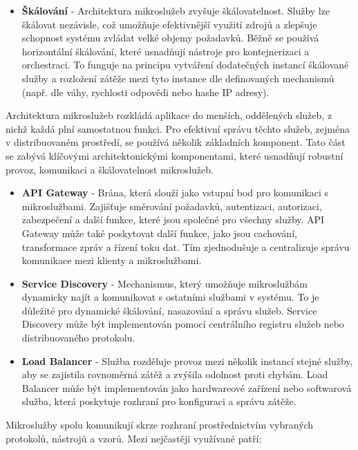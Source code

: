 \begin{itemize}
    \item \textbf{Škálování} - Architektura mikroslužeb zvyšuje škálovatelnost. Služby lze škálovat nezávisle, což umožňuje efektivnější využití zdrojů a zlepšuje schopnost systému zvládat velké objemy požadavků. Běžně se používá horizontální škálování, které usnadňují nástroje pro kontejnerizaci a orchestraci. To funguje na principu vytváření dodatečných instancí škálované služby a rozložení zátěže mezi tyto instance dle definovaných mechanismů (např. dle váhy, rychlosti odpovědi nebo hashe IP adresy).
\end{itemize}


Architektura mikroslužeb rozkládá aplikace do menších, oddělených služeb, z nichž každá plní samostatnou funkci. Pro efektivní správu těchto služeb, zejména v distribuovaném prostředí, se používá několik základních komponent. Tato část se zabývá klíčovými architektonickými komponentami, které usnadňují robustní provoz, komunikaci a škálovatelnost mikroslužeb. \cite{Williams2023}


\begin{itemize}
    \item \textbf{API Gateway} - Brána, která slouží jako vstupní bod pro komunikaci s mikroslužbami. Zajišťuje směrování požadavků, autentizaci, autorizaci, zabezpečení a další funkce, které jsou společné pro všechny služby. API Gateway může také poskytovat další funkce, jako jsou cachování, transformace zpráv a řízení toku dat. Tím zjednodušuje a centralizuje správu komunikace mezi klienty a mikroslužbami.
    \item \textbf{Service Discovery} - Mechanismus, který umožňuje mikroslužbám dynamicky najít a komunikovat s ostatními službami v systému. To je důležité pro dynamické škálování, nasazování a správu služeb. Service Discovery může být implementován pomocí centrálního registru služeb nebo distribuovaného protokolu.
    \item \textbf{Load Balancer} - Služba rozděluje provoz mezi několik instancí stejné služby, aby se zajistila rovnoměrná zátěž a zvýšila odolnost proti chybám. Load Balancer může být implementován jako hardwareové zařízení nebo softwarová služba, která poskytuje rozhraní pro konfiguraci a správu zátěže.
\end{itemize}


Mikroslužby spolu komunikují skrze rozhraní prostřednictvím vybraných protokolů, nástrojů a vzorů. Mezi nejčastěji využívané patří:

